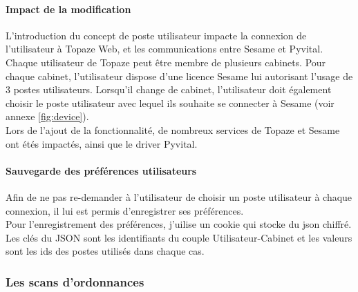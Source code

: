 \paragraph*{Impact de la modification\\}
L'introduction du concept de poste utilisateur impacte la connexion de l'utilisateur à Topaze Web, et les communications entre Sesame et Pyvital.\\
Chaque utilisateur de Topaze peut être membre de plusieurs cabinets. Pour chaque cabinet, l'utilisateur dispose d'une licence Sesame lui autorisant l'usage de 3 postes utilisateurs. Lorsqu'il change de cabinet, l'utilisateur doit également choisir le poste utilisateur avec lequel ils souhaite se connecter à Sesame (voir annexe \ref{fig:device}).\\

Lors de l'ajout de la fonctionnalité, de nombreux services de Topaze et Sesame ont étés impactés, ainsi que le driver Pyvital.

\paragraph*{Sauvegarde des préférences utilisateurs\\}
Afin de ne pas re-demander à l'utilisateur de choisir un poste utilisateur à chaque connexion, il lui est permis d'enregistrer ses préférences.\\
Pour l'enregistrement des préférences, j'uilise un cookie qui stocke du json chiffré. Les clés du JSON sont les identifiants du couple Utilisateur-Cabinet et les valeurs sont les ids des postes utilisés dans chaque cas.






\subsubsection{Les scans d'ordonnances}
